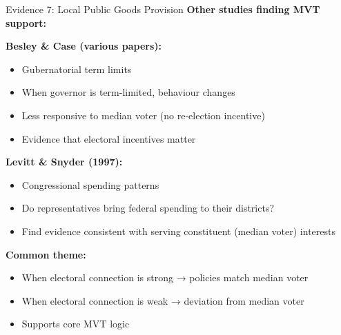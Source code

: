 \documentclass[10pt]{beamer}
\begin{document}
\begin{frame}[allowframebreaks]{Evidence 7: Local Public Goods Provision}
\textbf{Other studies finding MVT support:}



\textbf{Besley \& Case (various papers):}
\begin{itemize}
\item Gubernatorial term limits
\item When governor is term-limited, behaviour changes
\item Less responsive to median voter (no re-election incentive)
\item Evidence that electoral incentives matter
\end{itemize}



\textbf{Levitt \& Snyder (1997):}
\begin{itemize}
\item Congressional spending patterns
\item Do representatives bring federal spending to their districts?
\item Find evidence consistent with serving constituent (median voter) interests
\end{itemize}

 \framebreak   

\textbf{Common theme:}
\begin{itemize}
\item When electoral connection is strong → policies match median voter
\item When electoral connection is weak → deviation from median voter
\item \alert{Supports core MVT logic}
\end{itemize}
\end{frame}
\end{document}
